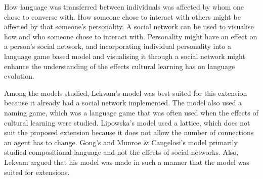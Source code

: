 How language was transferred between individuals was affected by whom one chose to converse with. How someone chose to interact with others might be affected by that someone’s personality. A social network can be used to visualise how and who someone chose to interact with. Personality might have an effect on a person’s social network, and incorporating individual personality into a language game based model and visualising it through a social network might enhance the understanding of the effects cultural learning has on language evolution. 

Among the models studied, Lekvam’s model \citep{lekvam2014co} was best suited for this extension because it already had a social network implemented. The model also used a naming game, which was a language game that was often used when the effects of cultural learning were studied. Lipowska’s model used a lattice, which does not suit the proposed extension because it does not allow the number of connections an agent has to change. Gong’s and Munroe \& Cangelosi’s model \citep{munroe2002learning} primarily studied compositional language and not the effects of social networks. Also, Lekvam argued that his model was made in such a manner that the model was suited for extensions.
